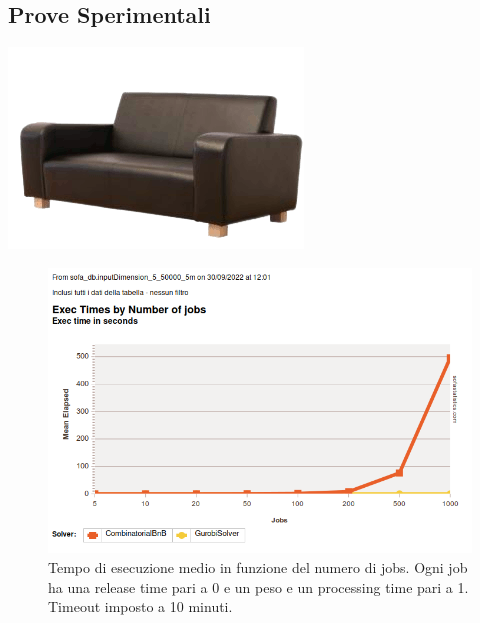 \documentclass[compress]{beamer}
\begin{document}
    \subsection{Prove Sperimentali}
    \begin{frame}{\subsecname \hfill \includegraphics[scale=0.1]{figs/sofastatsLogo.png}}
        \begin{figure}
            \includegraphics[scale=0.45]{../proofs/inputDimension_5-500000_meanExecByJobsBySolver_10m_lineChart.png}
            \caption[]{Tempo di esecuzione medio in funzione del numero di jobs. Ogni job 
            ha una release time pari a 0 e un peso e un processing time pari a 1. Timeout
            imposto a 10 minuti.}
            \label{fig:inputDimension_5-500000_meanExecByJobsBySolver_10m_lineChart}
        \end{figure}        
    \end{frame}
\end{document}
